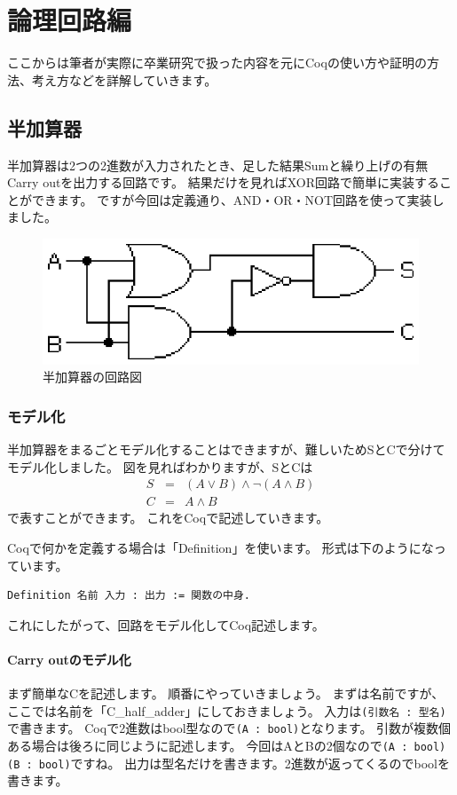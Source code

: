 \documentclass{jsbook}
\begin{document}
\chapter{論理回路編}
ここからは筆者が実際に卒業研究で扱った内容を元にCoqの使い方や証明の方法、考え方などを詳解していきます。
\newpage
\section{半加算器}
半加算器は2つの2進数が入力されたとき、足した結果Sumと繰り上げの有無Carry outを出力する回路です。
結果だけを見ればXOR回路で簡単に実装することができます。
ですが今回は定義通り、AND・OR・NOT回路を使って実装しました。

\begin{figure}[htbp]
\begin{center}
  \includegraphics[scale=1.0]{image/Half_adder.eps}
  \caption{半加算器の回路図}
\end{center}
\end{figure}

\subsection*{モデル化}
半加算器をまるごとモデル化することはできますが、難しいためSとCで分けてモデル化しました。
図を見ればわかりますが、SとCは
\begin{eqnarray}
S&=&(A \vee B) \wedge \lnot (A \wedge B) \nonumber \\
C&=&A \wedge B \nonumber
\end{eqnarray}
で表すことができます。
これをCoqで記述していきます。

Coqで何かを定義する場合は「Definition」を使います。
形式は下のようになっています。
\begin{verbatim}
Definition 名前 入力 : 出力 := 関数の中身.
\end{verbatim}
これにしたがって、回路をモデル化してCoq記述します。
\subsubsection*{Carry outのモデル化}
まず簡単なCを記述します。
順番にやっていきましょう。
まずは名前ですが、ここでは名前を「C\_half\_adder」にしておきましょう。
入力は\verb|(引数名 : 型名)|で書きます。
Coqで2進数はbool型なので\verb|(A : bool)|となります。
引数が複数個ある場合は後ろに同じように記述します。
今回はAとBの2個なので\verb|(A : bool) (B : bool)|ですね。
出力は型名だけを書きます。2進数が返ってくるのでboolを書きます。
\end{document}

